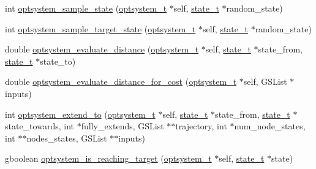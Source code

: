\begin{DoxyCompactItemize}
\item 
int \hyperlink{a00017_a778500228810cbc69a6d17494f889b87_a778500228810cbc69a6d17494f889b87}{optsystem\-\_\-sample\-\_\-state} (\hyperlink{a00018_a48d08bbb4534f55ba817743a2b91360c_a48d08bbb4534f55ba817743a2b91360c}{optsystem\-\_\-t} $\ast$self, \hyperlink{a00018_a1c9d0bb39483d4981491e6383b0dbb47_a1c9d0bb39483d4981491e6383b0dbb47}{state\-\_\-t} $\ast$random\-\_\-state)
\item 
int \hyperlink{a00017_a2294e6525f29f89ef7c0e3424063df15_a2294e6525f29f89ef7c0e3424063df15}{optsystem\-\_\-sample\-\_\-target\-\_\-state} (\hyperlink{a00018_a48d08bbb4534f55ba817743a2b91360c_a48d08bbb4534f55ba817743a2b91360c}{optsystem\-\_\-t} $\ast$self, \hyperlink{a00018_a1c9d0bb39483d4981491e6383b0dbb47_a1c9d0bb39483d4981491e6383b0dbb47}{state\-\_\-t} $\ast$random\-\_\-state)
\item 
double \hyperlink{a00017_afce48612176b92f14cb7ffcc91259454_afce48612176b92f14cb7ffcc91259454}{optsystem\-\_\-evaluate\-\_\-distance} (\hyperlink{a00018_a48d08bbb4534f55ba817743a2b91360c_a48d08bbb4534f55ba817743a2b91360c}{optsystem\-\_\-t} $\ast$self, \hyperlink{a00018_a1c9d0bb39483d4981491e6383b0dbb47_a1c9d0bb39483d4981491e6383b0dbb47}{state\-\_\-t} $\ast$state\-\_\-from, \hyperlink{a00018_a1c9d0bb39483d4981491e6383b0dbb47_a1c9d0bb39483d4981491e6383b0dbb47}{state\-\_\-t} $\ast$state\-\_\-to)
\item 
double \hyperlink{a00017_acb788463670e5a6ef08d3759e8fc22ba_acb788463670e5a6ef08d3759e8fc22ba}{optsystem\-\_\-evaluate\-\_\-distance\-\_\-for\-\_\-cost} (\hyperlink{a00018_a48d08bbb4534f55ba817743a2b91360c_a48d08bbb4534f55ba817743a2b91360c}{optsystem\-\_\-t} $\ast$self, \-G\-S\-List $\ast$inputs)
\item 
int \hyperlink{a00017_a10f9c56911d68043e9357824ef0440bc_a10f9c56911d68043e9357824ef0440bc}{optsystem\-\_\-extend\-\_\-to} (\hyperlink{a00018_a48d08bbb4534f55ba817743a2b91360c_a48d08bbb4534f55ba817743a2b91360c}{optsystem\-\_\-t} $\ast$self, \hyperlink{a00018_a1c9d0bb39483d4981491e6383b0dbb47_a1c9d0bb39483d4981491e6383b0dbb47}{state\-\_\-t} $\ast$state\-\_\-from, \hyperlink{a00018_a1c9d0bb39483d4981491e6383b0dbb47_a1c9d0bb39483d4981491e6383b0dbb47}{state\-\_\-t} $\ast$state\-\_\-towards, int $\ast$fully\-\_\-extends, \-G\-S\-List $\ast$$\ast$trajectory, int $\ast$num\-\_\-node\-\_\-states, int $\ast$$\ast$nodes\-\_\-states, \-G\-S\-List $\ast$$\ast$inputs)
\item 
gboolean \hyperlink{a00017_a6e1675238ed175e198390a142a966fbb_a6e1675238ed175e198390a142a966fbb}{optsystem\-\_\-is\-\_\-reaching\-\_\-target} (\hyperlink{a00018_a48d08bbb4534f55ba817743a2b91360c_a48d08bbb4534f55ba817743a2b91360c}{optsystem\-\_\-t} $\ast$self, \hyperlink{a00018_a1c9d0bb39483d4981491e6383b0dbb47_a1c9d0bb39483d4981491e6383b0dbb47}{state\-\_\-t} $\ast$state)
$$
\end{DoxyCompactItemize}
